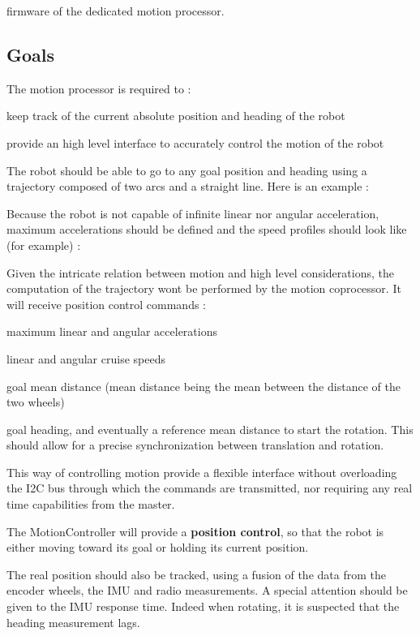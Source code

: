 firmware of the dedicated motion processor.

\subsection*{Goals}

The motion processor is required to \+:
\begin{DoxyItemize}
\item keep track of the current absolute position and heading of the robot
\item provide an high level interface to accurately control the motion of the robot
\end{DoxyItemize}

The robot should be able to go to any goal position and heading using a trajectory composed of two arcs and a straight line. Here is an example \+:



Because the robot is not capable of infinite linear nor angular acceleration, maximum accelerations should be defined and the speed profiles should look like (for example) \+:



Given the intricate relation between motion and high level considerations, the computation of the trajectory won\textquotesingle{}t be performed by the motion coprocessor. It will receive position control commands \+:
\begin{DoxyItemize}
\item maximum linear and angular accelerations
\item linear and angular cruise speeds
\item goal mean distance (mean distance being the mean between the distance of the two wheels)
\item goal heading, and eventually a reference mean distance to start the rotation. This should allow for a precise synchronization between translation and rotation.
\end{DoxyItemize}

This way of controlling motion provide a flexible interface without overloading the I2C bus through which the commands are transmitted, nor requiring any real time capabilities from the master.

The Motion\+Controller will provide a {\bfseries position control}, so that the robot is either moving toward its goal or holding its current position.

The real position should also be tracked, using a fusion of the data from the encoder wheels, the I\+MU and radio measurements. A special attention should be given to the I\+MU response time. Indeed when rotating, it is suspected that the heading measurement lags.

